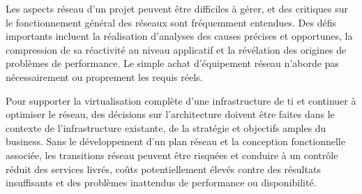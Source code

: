 Les aspects réseau d'un projet peuvent être difficiles à gérer, et des critiques sur le fonctionnement général des réseaux sont fréquemment entendues. Des défis importants incluent la réalisation d'analyses des causes précises et opportunes, la compression de sa réactivité au niveau applicatif et la révélation des origines de problèmes de performance. Le simple achat d'équipement réseau n'aborde pas nécessairement ou proprement les requis réels.





Pour supporter la virtualisation complète d'une infrastructure de \gls{ti} et continuer à optimiser le réseau, des décisions sur l'architecture doivent être faites dans le contexte de l'infrastructure existante, de la stratégie et objectifs amples du business. Sans le développement d'un plan réseau et la conception fonctionnelle associée, les transitions réseau peuvent être risquées et conduire à un contrôle réduit des services livrés, coûts potentiellement élevés contre des résultats insuffisants et des problèmes inattendus de performance ou disponibilité. 

